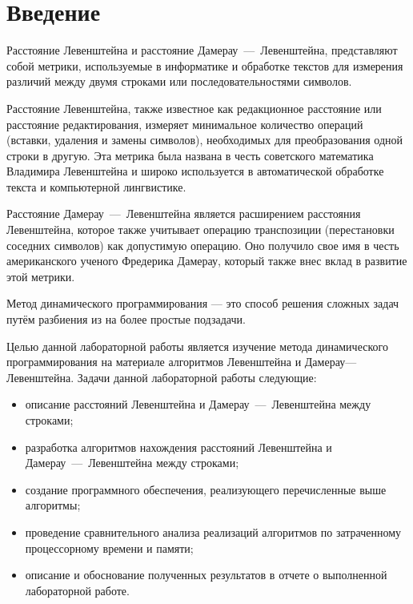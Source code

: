 \chapter*{Введение}

Расстояние Левенштейна и расстояние Дамерау~---~Левенштейна, представляют собой метрики, используемые в информатике и обработке текстов для измерения различий между двумя строками или последовательностями символов.

Расстояние Левенштейна, также известное как редакционное расстояние или расстояние редактирования, измеряет минимальное количество операций (вставки, удаления и замены символов), необходимых для преобразования одной строки в другую. Эта метрика была названа в честь советского математика Владимира Левенштейна и широко используется в автоматической обработке текста и компьютерной лингвистике.

Расстояние Дамерау~---~Левенштейна является расширением расстояния Левенштейна, которое также учитывает операцию транспозиции (перестановки соседних символов) как допустимую операцию. Оно получило свое имя в честь американского ученого Фредерика Дамерау, который также внес вклад в развитие этой метрики.

Метод динамического программирования --- это способ решения сложных задач путём разбиения из на более простые подзадачи.

Целью данной лабораторной работы является изучение метода динамического программирования на материале алгоритмов Левенштейна и Дамерау---Левенштейна.
Задачи данной лабораторной работы следующие:
\begin{itemize}
	\item описание расстояний Левенштейна и Дамерау~---~Левенштейна между строками;
	\item разработка алгоритмов нахождения расстояний Левенштейна и Дамерау~---~Левенштейна между строками;
    \item создание программного обеспечения, реализующего перечисленные выше алгоритмы;
    \item проведение сравнительного анализа реализаций алгоритмов по затраченному процессорному времени и памяти;
    \item описание и обоснование полученных результатов в отчете о выполненной лабораторной работе.
\end{itemize}
